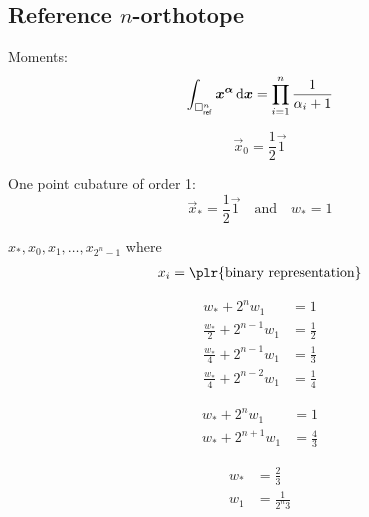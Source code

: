 \subsection{Reference \texorpdfstring{\(n\)}{n}-orthotope}

\begin{lemma}
    Moments:
    \[
        \int_{\square_{\mathsf{ref}}^n} \bm{x}^{\bm{\alpha}} \mathop{}\!\mathrm{d}\bm{x} = \prod_{i=1}^n \frac{1}{\alpha_i + 1}
    \]
\end{lemma}

\[
    \vec{x}_0 = \frac{1}{2} \vec{1}
\]

One point cubature of order 1:
\[
    \vec{x}_* = \frac{1}{2} \vec{1}
    \quad \text{and} \quad
    w_* = 1
\]

\( x_*, x_0, x_1, \ldots, x_{2^n-1} \) where
\begin{align*}
    x_i = \plr{\text{binary representation}}
\end{align*}

\begin{align*}
    w_* + 2^n w_1               & = 1
    \\
    \frac{w_*}{2} + 2^{n-1} w_1 & = \frac{1}{2}
    \\
    \frac{w_*}{4} + 2^{n-1} w_1 & = \frac{1}{3}
    \\
    \frac{w_*}{4} + 2^{n-2} w_1 & = \frac{1}{4}
\end{align*}

\begin{align*}
    w_* + 2^n w_1     & = 1
    \\
    w_* + 2^{n+1} w_1 & = \frac{4}{3}
\end{align*}

\begin{align*}
    w_* & = \frac{2}{3}
    \\
    w_1 & = \frac{1}{2^n 3}
\end{align*}
